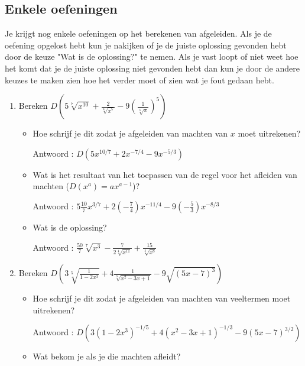 \subsection{Enkele oefeningen}
Je krijgt nog enkele oefeningen op het berekenen van afgeleiden.
Als je de oefening opgelost hebt kun je nakijken of je de juiste oplossing gevonden hebt door de keuze "Wat is de oplossing?" te nemen.
Als je vast loopt of niet weet hoe het komt dat je de juiste oplossing niet gevonden hebt dan kun je door de andere keuzes te maken zien hoe het verder moet of zien wat je fout gedaan hebt. 

\begin{enumerate}
	
	\item Bereken $D \left( 5\sqrt[7] {x^{10}}+\frac {2}{\sqrt[4]{x^7}}-9 \left( \frac {1}{\sqrt [3]{x}}  \right)^5 \right)$
	
	\begin{itemize}
		\item Hoe schrijf je dit zodat je afgeleiden van machten van $x$ moet uitrekenen?
		
		Antwoord : $D \left(  5x^{10/7}+2x^{-7/4}-9x^{-5/3}  \right)$
		
		\item Wat is het resultaat van het toepassen van de regel voor het afleiden van machten ($D(x^a)=ax^{a-1}$)?
		
		Antwoord : $5\frac{10}{7}x^{3/7}+2\left( -\frac{7}{4} \right)x^{-11/4}-9\left(  -\frac{5}{3}  \right) x^{-8/3}$
		
		\item Wat is de oplossing?
		
		Antwoord : $\frac {50}{7}\sqrt[7]{x^3}-\frac{7}{2\sqrt[4]{x^{11}}}+\frac{15}{\sqrt[3]{x^8}}$
		
	\end{itemize}
	
	\item Bereken $D \left(  3 \sqrt[5]{\frac{1}{1-2x^3}}+4\frac{1}{\sqrt[3]{x^2-3x+1}}-9\sqrt{(5x-7)^3}  \right)$
	
	\begin{itemize}
		
		\item Hoe schrijf je dit zodat je afgeleiden van machten van veeltermen moet uitrekenen?
		
		Antwoord : $D \left( 3 \left(  1-2x^3 \right)^{-1/5}+4 \left( x^2-3x+1  \right)^{-1/3}-9 \left(  5x-7 \right)^{3/2}  \right)$
		
		\item Wat bekom je als je die machten afleidt? 
		

\end{itemize}
\end{enumerate}

